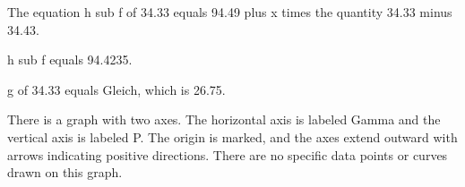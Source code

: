 The equation h sub f of 34.33 equals 94.49 plus x times the quantity 34.33 minus 34.43.

h sub f equals 94.4235.

g of 34.33 equals Gleich, which is 26.75.

There is a graph with two axes. The horizontal axis is labeled Gamma and the vertical axis is labeled P. The origin is marked, and the axes extend outward with arrows indicating positive directions. There are no specific data points or curves drawn on this graph.
